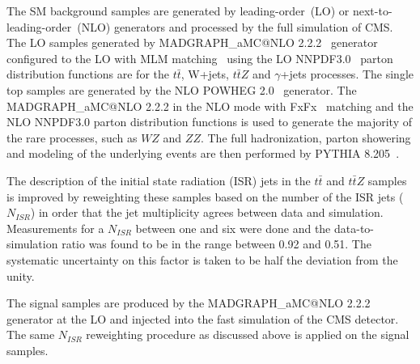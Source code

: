 The SM background samples are generated by leading-order~(LO) or next-to-leading-order~(NLO) generators and processed by the full simulation of CMS. The LO samples generated by MADGRAPH\_aMC@NLO 2.2.2~\cite{Alwall:2014hca} generator configured to the LO with MLM matching~\cite{Alwall:2007fs} using the LO NNPDF3.0~\cite{Ball:2014uwa} parton distribution functions are for the  $t\bar{t}$, W+jets, $t\bar{t}Z$ and $\gamma$+jets processes. The single top samples are generated by the NLO POWHEG 2.0~\cite{Alioli:2010xd} generator. The MADGRAPH\_aMC@NLO 2.2.2 in the NLO mode with FxFx~\cite{Frederix:2012ps} matching and the NLO NNPDF3.0 parton distribution functions is used to generate the majority of the rare processes, such as $WZ$ and $ZZ$. The full hadronization, parton showering and modeling of the underlying events are then performed by PYTHIA 8.205~\cite{Sjostrand:2014zea}.

The description of the initial state radiation (ISR) jets in the $t\bar{t}$ and $t\bar{t}Z$ samples is improved by reweighting these samples based on the number of the ISR jets ($N_{ISR}$) in order that the jet multiplicity agrees between data and simulation. Measurements for a $N_{ISR}$ between one and six were done and the data-to-simulation ratio was found to be in the range between 0.92 and 0.51. The systematic uncertainty on this factor is taken to be half the deviation from the unity.

The signal samples are produced by the MADGRAPH\_aMC@NLO 2.2.2 generator at the LO and injected into the fast simulation of the CMS detector.  The same $N_{ISR}$ reweighting procedure as discussed above is applied on the signal samples. 

